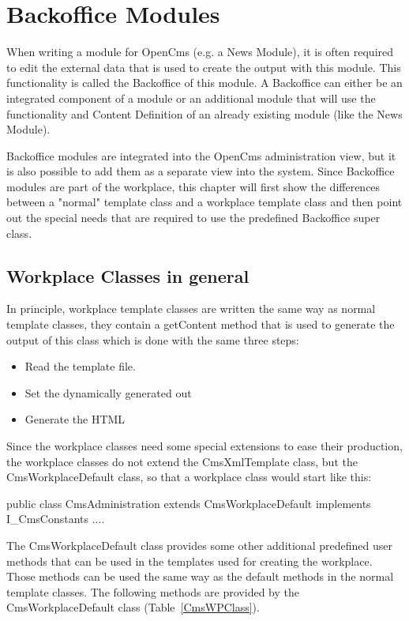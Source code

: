 \chapter {Backoffice Modules}
\label{Backoffice Modules}
When writing a module for OpenCms (e.g. a News Module), it is often
required to edit the external data that is used to create the output
with this module. This functionality is called the Backoffice of this
module. A Backoffice can either be an integrated component of a module
or an additional module that will use the functionality and Content
Definition of an already existing module (like the News Module).

Backoffice modules are integrated into the OpenCms administration view,
but it is also possible to add them as a separate view into the system.
Since Backoffice modules are part of the workplace, this chapter will
first show the differences between a {\class "normal"} template class and a
workplace template class and then point out the special needs that are
required to use the predefined Backoffice super class.

\section {Workplace Classes in general}
In principle, workplace template classes are written the same way as
normal template classes, they contain a getContent method that is used
to generate the output of this class which is done with the same three
steps:
\begin{itemize}
\item Read the template file.
\item Set the dynamically generated out
\item Generate the HTML
\end{itemize}

Since the workplace classes need some special extensions to ease their
production, the workplace classes do not extend the CmsXmlTemplate
class, but the CmsWorkplaceDefault class, so that a workplace class
would start like this:
\begin{java}
public class CmsAdministration extends CmsWorkplaceDefault implements
I\_CmsConstants {....}
\end{java}

The {\class CmsWorkplaceDefault} class provides some other additional predefined
user methods that can be used in the templates used for creating the
workplace. Those methods can be used the same way as the default methods
in the normal template classes. The following methods are provided by
the {\class CmsWorkplaceDefault} class (Table~\ref{CmsWPClass}).


